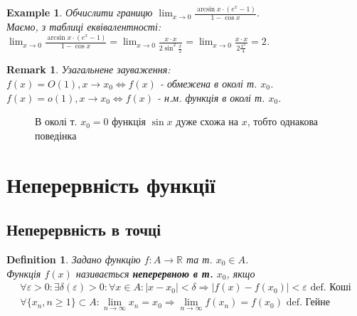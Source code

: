 \documentclass[a4paper, 14pt]{article}
\theoremstyle{theoremdd}
\theoremstyle{theoremdd}
\newtheorem{definition}[theorem]{Definition}
\theoremstyle{theoremdd}
\theoremstyle{theoremdd}
\newtheorem{example}[theorem]{Example}
\theoremstyle{theoremdd}
\theoremstyle{theoremdd}
\newtheorem{remark}[theorem]{Remark}
\theoremstyle{theoremdd}
\theoremstyle{theoremdd}
\begin{document}
\begin{example}
Обчислити границю $\displaystyle \lim_{x \to 0} \frac{\arcsin x \cdot (e^x - 1)}{1 - \cos x}$.\\
Маємо, з таблиці еквівалентності:\\
$\displaystyle \lim_{x \to 0} \frac{\arcsin x \cdot (e^x - 1)}{1 - \cos x} = \lim_{x \to 0} \frac{x \cdot x}{2 \sin^2 \frac{x}{2}} = \lim_{x \to 0} \frac{x \cdot x}{2 \frac{x^2}{4}} = 2$.
\end{example}

\begin{remark}
Узагальнене зауваження:\\
$f(x) = O(1), x \to x_0 \iff f(x)$ - обмежена в околі т. $x_0$.\\
$f(x) = o(1), x \to x_0 \iff f(x)$ - н.м. функція в околі т. $x_0$.
\end{remark}
\begin{figure} [H]
\centering
{}
\caption*{В околі т. $x_0 = 0$ функція $\sin x$ дуже схожа на $x$, тобто однакова поведінка}
\end{figure}
\newpage

\section{Неперервність функції}
\subsection{Неперервність в точці}
\begin{definition}
Задано функцію $f: A \to \mathbb{R}$ та т. $x_0 \in A$.\\
Функція $f(x)$ називається \textbf{неперервною в т.} $x_0$, якщо
\begin{align*}
\forall \varepsilon > 0: \exists \delta(\varepsilon) > 0: \forall x \in A: |x-x_0| < \delta \Rightarrow |f(x)-f(x_0)| < \varepsilon \text{ def. Коші} \\
\forall \{x_n, n \geq 1\} \subset A: \displaystyle\lim_{n \to \infty} x_n = x_0 \Rightarrow \displaystyle\lim_{n \to \infty} f(x_n) = f(x_0) \text{ def. Гейне}
\end{align*}
\end{definition}
\end{document}
